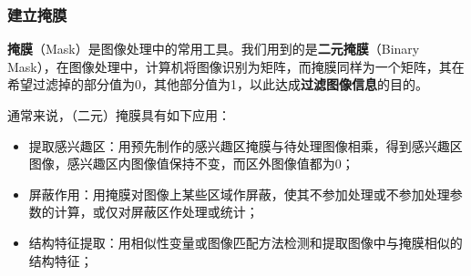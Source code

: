 \documentclass{beamer}
\begin{document}
\begin{frame}
\frametitle{建立掩膜}
\textbf{掩膜}（Mask）是图像处理中的常用工具。我们用到的是\textbf{二元掩膜}（Binary Mask），在图像处理中，计算机将图像识别为矩阵，而掩膜同样为一个矩阵，其在希望过滤掉的部分值为0，其他部分值为1，以此达成\textbf{过滤图像信息}的目的。\pause

通常来说，（二元）掩膜具有如下应用：
\begin{itemize}
\item 提取感兴趣区：用预先制作的感兴趣区掩膜与待处理图像相乘，得到感兴趣区图像，感兴趣区内图像值保持不变，而区外图像值都为0；\pause
\item 屏蔽作用：用掩膜对图像上某些区域作屏蔽，使其不参加处理或不参加处理参数的计算，或仅对屏蔽区作处理或统计；\pause
\item 结构特征提取：用相似性变量或图像匹配方法检测和提取图像中与掩膜相似的结构特征；
\end{itemize}
\end{frame}
\end{document}
